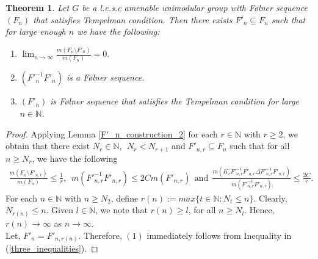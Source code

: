 \documentclass[11pt]{amsart}
\newtheorem{thm}{Theorem}[section]
\theoremstyle{definition}
\theoremstyle{myremark}
\numberwithin{equation}{section}
\def\N{\mathbb N}
\begin{document}
\begin{thm}\label{existence_of_F'_n}
    Let $G$ be a l.c.s.c amenable unimodular group with F\o lner sequence $(F_n)$ that satisfies Tempelman condition. Then there exists $F'_n \subseteq F_n$ such that for large enough $n$ we have the following: 
    \begin{enumerate}
    \item $\displaystyle\lim_{n\to \infty}\frac{m(F_n\setminus F'_n)}{m(F_n)}=0.$
        \item $({F'^{-1}_n}F'_n)$ is a F\o lner sequence. 
        \item $(F'_n)$ is F\o lner sequence that satisfies the Tempelman condition for large $n \in \mathbb{N}$.
    \end{enumerate}
\end{thm}
\begin{proof}
 Applying Lemma \ref{F'_n_construction_2} for each $r\in \N $ with $r\geq 2$, we obtain that there exist $N_r \in \mathbb{N}, ~~N_r < N_{r+1}$ and $F'_{n,r} \subseteq F_n$ such that for all $n \geq N_r$, we have the following
 \begin{align}\label{three_inequalities}
     \frac{m(F_n \setminus F'_{n,r})}{m(F_n)} \leq \frac{1}{r},~~ m({F'^{-1}_{n,r}}F'_{n,r})  \leq 2Cm(F'_{n,r}) ~~\text{and}~~ \frac{m(K_r{F'^{-1}_{n,r}}F'_{n,r} \Delta {F'^{-1}_{n,r}}F'_{n,r})}{m({F'^{-1}_{n,r}}F'_{n,r})} \leq \frac{2C}{r}.
 \end{align}
For each $ n \in \N $  with $ n\geq N_2$, define $r(n):=max\{t\in \mathbb{N}:N_t \leq n\}.$ Clearly, $N_{r(n)} \leq n$. Given $l \in \mathbb{N}$, we note that   $r(n) \geq l$,  for all $ n\geq N_l$. Hence, $r(n) \to \infty$ as $n\to \infty.$\\
Let, $F'_n= F'_{n,r(n)}$. Therefore, $(1)$ immediately follows from Inequality in (\ref{three_inequalities}).


\end{proof}
\end{document}
